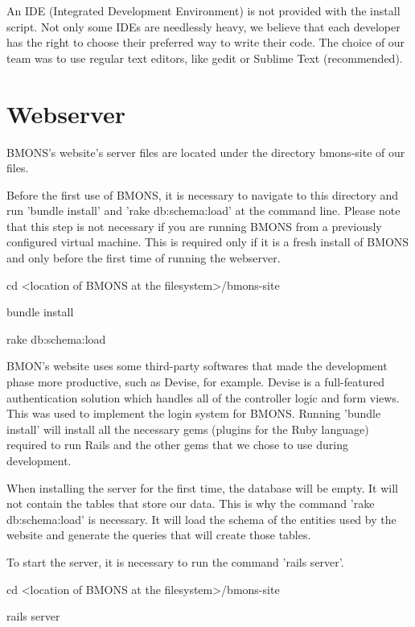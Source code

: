An IDE (Integrated Development Environment) is not provided with the install script. Not only some IDEs are needlessly heavy, we believe that each developer has the right to choose their preferred way to write their code. The choice of our team was to use regular text editors, like gedit or Sublime Text (recommended).

\clearpage
\section{Webserver}

BMONS's website's server files are located under the directory bmons-site of our files. 

Before the first use of BMONS, it is necessary to navigate to this directory and run 'bundle install' and 'rake db:schema:load' at the command line. Please note that this step is not necessary if you are running BMONS from a previously configured virtual machine. This is required only if it is a fresh install of BMONS and only before the first time of running the webserver.



\indent\indent cd <location of BMONS at the filesystem>/bmons-site

\indent\indent bundle install

\indent\indent rake db:schema:load



BMON's website uses some third-party softwares that made the development phase more productive, such as Devise, for example. Devise is a full-featured authentication solution which handles all of the controller logic and form views. This was used to implement the login system for BMONS. Running 'bundle install' will install all the necessary gems (plugins for the Ruby language) required to run Rails and the other gems that we chose to use during development. 


When installing the server for the first time, the database will be empty. It will not contain the tables that store our data. This is why the command 'rake db:schema:load' is necessary. It will load the schema of the entities used by the website and generate the queries that will create those tables.


To start the server, it is necessary to run the command 'rails server'.



\indent\indent cd <location of BMONS at the filesystem>/bmons-site

\indent\indent rails server



